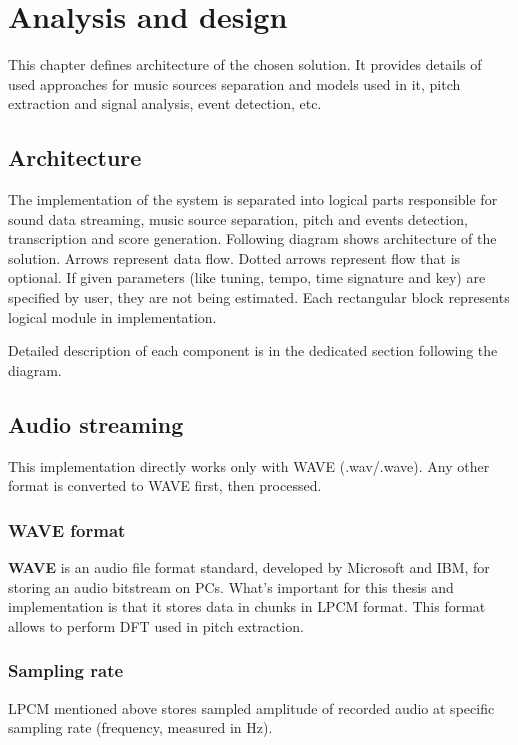 \chapter{Analysis and design}\label{ch:analysis-and-design}

This chapter defines architecture of the chosen solution. It provides details of used approaches for music sources
separation and models used in it, pitch extraction and signal analysis, event detection, etc.

\section{Architecture}\label{sec:architecture}

The implementation of the system is separated into logical parts responsible for sound data streaming, music source
separation, pitch and events detection, transcription and score generation. Following diagram shows architecture of
the solution. Arrows represent data flow. Dotted arrows represent flow that is optional. If given parameters (like
tuning, tempo, time signature and key) are specified by user, they are not being estimated. Each rectangular block
represents logical module in implementation.

Detailed description of each component is in the dedicated section following the diagram.



\section{Audio streaming}\label{sec:audio-streaming}

This implementation directly works only with \ac{WAVE} (.wav/.wave). Any other format is converted to WAVE first,
then processed.

\subsection{WAVE format}\label{subsec:wave-format}
\textbf{WAVE} is an audio file format standard, developed by Microsoft and IBM, for storing an audio bitstream on PCs.
What's important for this thesis and implementation is that it stores data in chunks in \ac{LPCM} format. This format
allows to perform \ac{DFT} used in pitch extraction.

\subsection{Sampling rate}\label{subsec:sampling-rate}
\ac{LPCM} mentioned above stores sampled amplitude of recorded audio at specific sampling rate (frequency, measured in
Hz).

